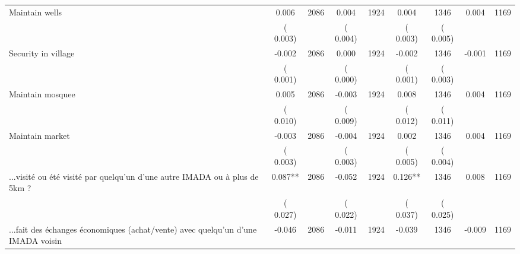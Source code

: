 \begin{tabular}{l*{8}{c}}
Maintain wells        &              0.006      &       2086       &              0.004      &       1924       &              0.004      &       1346  &        0.004 &       1169       \\
                       &       (       0.003)            &                               &       (       0.004)            &                               &       (       0.003)            &       (       0.005) &                  \\
Security in village        &             -0.002      &       2086       &              0.000      &       1924       &             -0.002      &       1346  &       -0.001 &       1169       \\
                       &       (       0.001)            &                               &       (       0.000)            &                               &       (       0.001)            &       (       0.003) &                  \\
Maintain mosquee        &              0.005      &       2086       &             -0.003      &       1924       &              0.008      &       1346  &        0.004 &       1169       \\
                       &       (       0.010)            &                               &       (       0.009)            &                               &       (       0.012)            &       (       0.011) &                  \\
Maintain market        &             -0.003      &       2086       &             -0.004      &       1924       &              0.002      &       1346  &        0.004 &       1169       \\
                       &       (       0.003)            &                               &       (       0.003)            &                               &       (       0.005)            &       (       0.004) &                  \\
...visité ou été visité par quelqu'un d'une autre IMADA ou à plus de 5km ?        &              0.087**      &       2086       &             -0.052      &       1924       &              0.126**      &       1346  &        0.008 &       1169       \\
                       &       (       0.027)            &                               &       (       0.022)            &                               &       (       0.037)            &       (       0.025) &                  \\
...fait des échanges économiques (achat/vente) avec quelqu'un d'une IMADA voisin        &             -0.046      &       2086       &             -0.011      &       1924       &             -0.039      &       1346  &       -0.009 &       1169       \\

\end{tabular}
